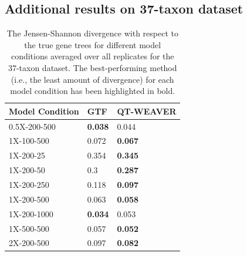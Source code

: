 \documentclass[runningheads]{llncs}
\begin{document}
\begin{appendices}
\subsection{Additional results on 37-taxon dataset}
\label{app:37-taxon}

\vspace{-22pt}
\begin{table}[h!]
    \centering
    \caption{The Jensen-Shannon divergence with respect to the true gene trees for different model conditions averaged over all replicates for the 37-taxon dataset. The best-performing method (i.e., the least amount of divergence) for each model condition has been highlighted in bold.}
    \label{tab:37-divergence}
    \begin{tabular}{|C{3cm}|C{3cm}|C{3cm}|}
        \hline
        \textbf{Model Condition} & \textbf{GTF} & \textbf{QT-WEAVER} \\
        \hline
        0.5X-200-500 & \textbf{0.038} & 0.044 \\
        \hline
        1X-100-500 & 0.072 & \textbf{0.067} \\
        \hline
        1X-200-25 & 0.354 & \textbf{0.345} \\
        \hline
        1X-200-50 & 0.3 & \textbf{0.287} \\
        \hline
        1X-200-250 & 0.118 & \textbf{0.097} \\
        \hline
        1X-200-500 & 0.063 & \textbf{0.058} \\
        \hline
        1X-200-1000 & \textbf{0.034} & 0.053 \\
        \hline
        1X-500-500 & 0.057 & \textbf{0.052} \\
        \hline
        2X-200-500 & 0.097 & \textbf{0.082} \\
        \hline
    \end{tabular}
\end{table}


\end{appendices}
\end{document}
